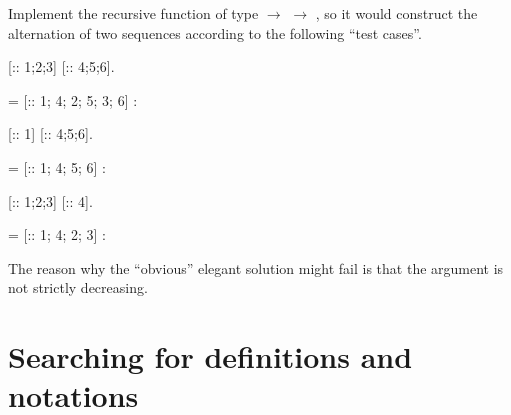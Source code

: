\begin{exercise}


Implement the recursive function  of type   \ensuremath{\rightarrow} 
 \ensuremath{\rightarrow}  , so it would construct the alternation of two
sequences according to the following ``test cases''.


\begin{coqdoccode}
\coqdocemptyline
\coqdocemptyline
\coqdocnoindent
{}    [:: 1;2;3] [:: 4;5;6].\coqdoceol
\coqdocemptyline
\end{coqdoccode}
\coqdoceol
\coqdocemptyline
\coqdocindent{2.50em}
= [:: 1; 4; 2; 5; 3; 6]\coqdoceol
\coqdocindent{2.50em}
:  

\coqdocemptyline
\begin{coqdoccode}
\coqdocemptyline
\coqdocnoindent
{}    [:: 1] [:: 4;5;6].\coqdoceol
\coqdocemptyline
\end{coqdoccode}


\coqdoceol
\coqdocemptyline
\coqdocindent{2.50em}
= [:: 1; 4; 5; 6]\coqdoceol
\coqdocindent{2.50em}
:  

\coqdocemptyline


\begin{coqdoccode}
\coqdocemptyline
\coqdocnoindent
{}    [:: 1;2;3] [:: 4].\coqdoceol
\coqdocemptyline
\end{coqdoccode}


\coqdoceol
\coqdocemptyline
\coqdocindent{2.50em}
= [:: 1; 4; 2; 3]\coqdoceol
\coqdocindent{2.50em}
:  

\coqdocemptyline


\hint The reason why the ``obvious'' elegant solution might fail is
 that the argument is not strictly decreasing.


\end{exercise}




\section{Searching for definitions and notations}




